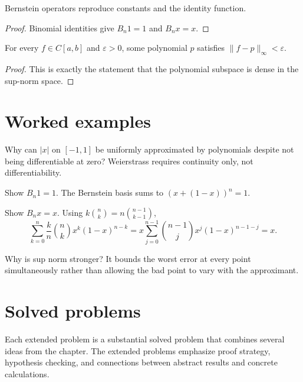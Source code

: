 \begin{theorem}\label{thm:ii21-02}
Bernstein operators reproduce constants and the identity function.
\begin{proof}
Binomial identities give $B_n1=1$ and $B_nx=x$.
\end{proof}
\end{theorem}

\begin{theorem}\label{thm:ii21-03}
For every $f\in C[a,b]$ and $\varepsilon>0$, some polynomial $p$ satisfies $\|f-p\|_\infty<\varepsilon$.
\begin{proof}
This is exactly the statement that the polynomial subspace is dense in the sup-norm space.
\end{proof}
\end{theorem}

\section{Worked examples}

\begin{example}\label{ex:ii21-worked-01}
Why can $|x|$ on $[-1,1]$ be uniformly approximated by polynomials despite not being differentiable at zero? Weierstrass requires continuity only, not differentiability.
\end{example}

\begin{example}\label{ex:ii21-worked-02}
Show $B_n1=1$. The Bernstein basis sums to $(x+(1-x))^n=1$.
\end{example}

\begin{example}\label{ex:ii21-worked-03}
Show $B_nx=x$. Using $k\binom nk=n\binom{n-1}{k-1}$,
\[
\sum_{k=0}^n\frac{k}{n}\binom nkx^k(1-x)^{n-k}
=x\sum_{j=0}^{n-1}\binom{n-1}{j}x^j(1-x)^{n-1-j}=x.
\]
\end{example}

\begin{example}\label{ex:ii21-worked-04}
Why is sup norm stronger? It bounds the worst error at every point simultaneously rather than allowing the bad point to vary with the approximant.
\end{example}

\section{Solved problems}
Each extended problem is a substantial solved problem that combines several ideas from the chapter. The extended problems emphasize proof strategy, hypothesis checking, and connections between abstract results and concrete calculations.

